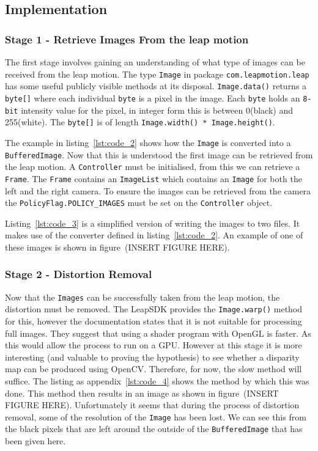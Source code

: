 \documentclass[11pt,oneside]{report}
\newcommand\code[1]{\texttt{#1}}
\begin{document}
		\subsection{Implementation}
		\subsubsection{Stage 1 - Retrieve Images From the leap motion}
		The first stage involves gaining an understanding of what type of images can be received from the leap motion.
		The type \code{Image} in package \code{com.leapmotion.leap} has some useful publicly visible methods at its disposal.
		\code{Image.data()} returns a \code{byte[]} where each individual \code{byte} is a pixel in the image.
		Each \code{byte} holds an \code{8-bit} intensity value for the pixel, in integer form this is between 0(black) and 255(white).
		The \code{byte[]} is of length \code{Image.width() * Image.height()}.
		
		The example in listing~\ref{lst:code_2} shows how the \code{Image} is converted into a \code{BufferedImage}.
		Now that this is understood the first image can be retrieved from the leap motion.
		A \code{Controller} must be initialised, from this we can retrieve a \code{Frame}.
		The \code{Frame} contains an \code{ImageList} which contains an \code{Image} for both the left and the right camera.
		To ensure the images can be retrieved from the camera the \code{PolicyFlag.POLICY\_IMAGES} must be set on the \code{Controller} object.
		
		Listing~\ref{lst:code_3} is a simplified version of writing the images to two files.
		It makes use of the converter defined in listing~\ref{lst:code_2}.
		An example of one of these images is shown in figure~(INSERT FIGURE HERE). %
			
			
		\subsubsection{Stage 2 - Distortion Removal}
		Now that the \code{Images} can be successfully taken from the leap motion, the distortion must be removed.
		The LeapSDK provides the \code{Image.warp()} method for this, however the documentation states that it is not suitable for processing full images.
		They suggest that using a shader program with OpenGL is faster.
		As this would allow the process to run on a GPU.
		However at this stage it is more interesting (and valuable to proving the hypothesis) to see whether a disparity map can be produced using OpenCV.
		Therefore, for now, the slow method will suffice.
		The listing as appendix~\ref{lst:code_4} shows the method by which this was done.
		This method then results in an image as shown in figure~(INSERT FIGURE HERE).
		Unfortunately it seems that during the process of distortion removal, some of the resolution of the \code{Image} has been lost.
		We can see this from the black pixels that are left around the outside of the \code{BufferedImage} that has been given here.
		
\end{document}
